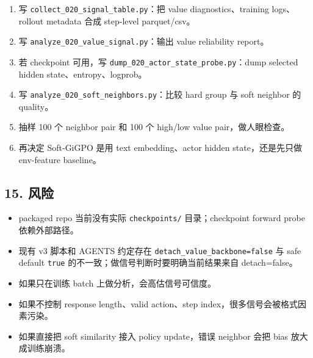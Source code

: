 \documentclass[
  10pt,
]{ctexart}
\providecommand{\tightlist}{%
  \setlength{\itemsep}{0pt}\setlength{\parskip}{0pt}}
\begin{document}
\begin{enumerate}
\def\labelenumi{\arabic{enumi}.}
\tightlist
\item
  写 \texttt{collect\_020\_signal\_table.py}：把 value
  diagnostics、training logs、rollout metadata 合成 step-level
  parquet/csv。
\item
  写 \texttt{analyze\_020\_value\_signal.py}：输出 value reliability
  report。
\item
  若 checkpoint 可用，写
  \texttt{dump\_020\_actor\_state\_probe.py}：dump selected hidden
  state、entropy、logprob。
\item
  写 \texttt{analyze\_020\_soft\_neighbors.py}：比较 hard group 与 soft
  neighbor 的 quality。
\item
  抽样 100 个 neighbor pair 和 100 个 high/low value pair，做人眼检查。
\item
  再决定 Soft-GiGPO 是用 text embedding、actor hidden state，还是先只做
  env-feature baseline。
\end{enumerate}

\subsection{15. 风险}\label{ux98ceux9669}

\begin{itemize}
\tightlist
\item
  packaged repo 当前没有实际 \texttt{checkpoints/} 目录；checkpoint
  forward probe 依赖外部路径。
\item
  现有 v3 脚本和 AGENTS 约定存在 \texttt{detach\_value\_backbone=false}
  与 safe default \texttt{true} 的不一致；做信号判断时要明确当前结果来自
  detach=false。
\item
  如果只在训练 batch 上做分析，会高估信号可信度。
\item
  如果不控制 response length、valid action、step
  index，很多信号会被格式因素污染。
\item
  如果直接把 soft similarity 接入 policy update，错误 neighbor 会把 bias
  放大成训练崩溃。
\end{itemize}
\end{document}
